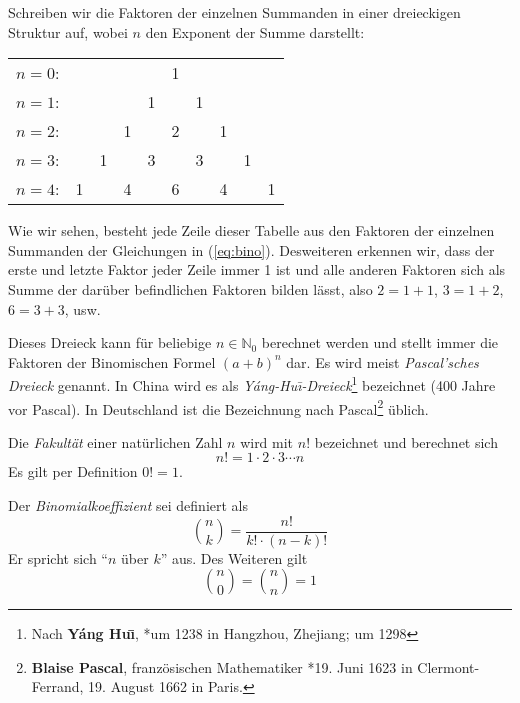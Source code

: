 \begin{definition}
Schreiben wir die Faktoren der einzelnen Summanden in einer dreieckigen Struktur auf, wobei $n$ den Exponent der Summe darstellt:

\begin{center}
\begin{tabular}{rccccccccc} 
$n=0$:& & & & & 1\\
\noalign{\smallskip} $n=1$:& & & & 1 & & 1\\
\noalign{\smallskip} $n=2$:& & & 1 & & 2 & & 1\\
\noalign{\smallskip} $n=3$:& & 1 & & 3 & & 3 & & 1\\
\noalign{\smallskip} $n=4$:& 1 & & 4 & & 6 & & 4 & & 1
\end{tabular}
\end{center}
Wie wir sehen, besteht jede Zeile dieser Tabelle aus den Faktoren der einzelnen Summanden der Gleichungen in (\ref{eq:bino}). Desweiteren erkennen wir, dass der erste und letzte Faktor jeder Zeile immer 1 ist und alle anderen Faktoren sich als Summe der darüber befindlichen Faktoren bilden lässt, also $2=1+1$, $3=1+2$, $6=3+3$, usw.
\end{definition}

Dieses Dreieck kann für beliebige $n\in \mathbb{N}_0$ berechnet werden und stellt immer die Faktoren der Binomischen Formel $(a+b)^n$ dar. Es wird meist \emph{Pascal'sches Dreieck} genannt. In China wird es als \emph{Yáng-Hu\=\i-Dreieck}\footnote{Nach \textbf{Yáng Hu\=\i}, *um 1238 in Hangzhou, Zhejiang;  um 1298} bezeichnet (400 Jahre vor Pascal). In Deutschland ist die Bezeichnung nach Pascal\footnote{\textbf{Blaise Pascal}, französischen Mathematiker *19. Juni 1623 in Clermont-Ferrand, 19. August 1662 in Paris.} üblich.

\begin{definition}
Die \emph{Fakultät} einer natürlichen Zahl $n$ wird mit $n!$ bezeichnet und berechnet sich
\[
n! = 1\cdot 2\cdot 3 \dotsm n
\]
Es gilt per Definition $0! =1$.
\end{definition}

\begin{definition}
Der \emph{Binomialkoeffizient} sei definiert als 
\[
	\binom{n}{k} = \frac{n!}{k!\cdot (n-k)!}
\]
Er spricht sich "`$n$ über $k$"' aus. Des Weiteren gilt 
\[
\binom{n}{0} = \binom{n}{n} = 1
\]
\end{definition}

